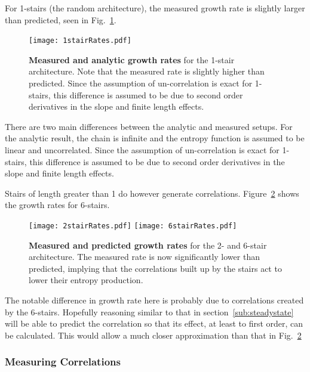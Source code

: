 For 1-stairs (the random architecture), the measured growth rate is slightly larger than predicted, seen in Fig.~\ref{fig:1stairRates}.
\begin{figure}
	\centering
	\texttt{[image: 1stairRates.pdf]}
	\caption{\textbf{Measured and analytic growth rates} for the 1-stair architecture. Note that the measured rate is slightly higher than predicted. Since the assumption of un-correlation is exact for 1-stairs, this difference is assumed to be due to second order derivatives in the slope and finite length effects.}
	\label{fig:1stairRates}
\end{figure}
There are two main differences between the analytic and measured setups. For the analytic result, the chain is infinite and the entropy function is assumed to be linear and uncorrelated. Since the assumption of un-correlation is exact for 1-stairs, this difference is assumed to be due to second order derivatives in the slope and finite length effects.

Stairs of length greater than 1 do however generate correlations. Figure~\ref{fig:6stairRates} shows the growth rates for 6-stairs. 
\begin{figure}
	\centering
	\texttt{[image: 2stairRates.pdf]}
	\texttt{[image: 6stairRates.pdf]}
	\caption{\textbf{Measured and predicted growth rates} for the 2- and 6-stair architecture. The measured rate is now significantly lower than predicted, implying that the correlations built up by the stairs act to lower their entropy production.}
	\label{fig:6stairRates}
\end{figure}
The notable difference in growth rate here is probably due to correlations created by the 6-stairs. Hopefully reasoning similar to that in section~\ref{sub:steadystate} will be able to predict the correlation so that its effect, at least to first order, can be calculated. This would allow a much closer approximation than that in Fig.~\ref{fig:6stairRates}

\subsubsection{Measuring Correlations}  \label{subsub:correlations}

